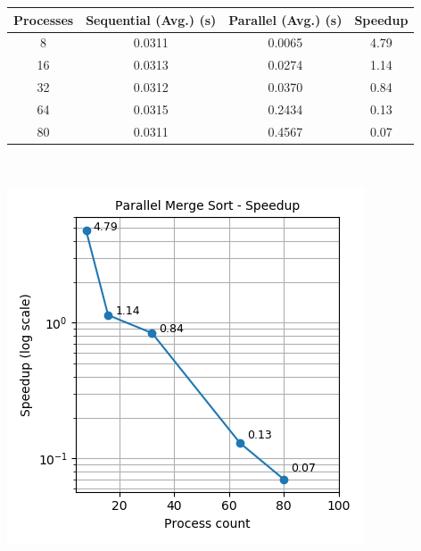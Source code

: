 \documentclass[11pt,a4paper,oneside]{article}
\begin{document}
	  \begin{center}
		\begin{tabular}{|c|c|c|c|}
			\hline 
			\textbf{Processes}  & \textbf{Sequential (Avg.) (s)} & \textbf{Parallel (Avg.) (s)} & \textbf{Speedup} \\
			\hline
		    8 &  0.0311 & 0.0065 & 4.79\\ 
			\hline 
		    16 &  0.0313 & 0.0274 & 1.14\\
			\hline 
			32 &  0.0312 & 0.0370 & 0.84\\
			\hline 
			64 &  0.0315 & 0.2434 & 0.13\\ 
			\hline 
			80 &  0.0311 & 0.4567 & 0.07 \\
			\hline  
		\end{tabular}
	\end{center}
	\begin{verbatim}
	
	\end{verbatim}
	\begin{center}
		\includegraphics[scale=0.7]{4.png}		
	\end{center}

     \begin{verbatim}
             
     
     
     \end{verbatim}
\end{document}
